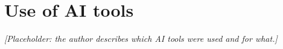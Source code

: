 \section*{Use of AI tools}

\textit{[Placeholder: the author describes which AI tools were used and for what.]}
